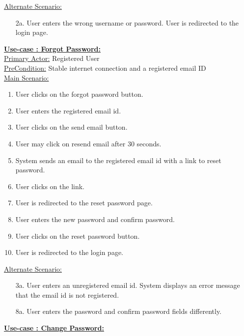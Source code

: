 \documentclass[conference,compsoc]{IEEEtran}
\newcounter{UC}
\newcommand{\nextU}{\stepcounter{UC}\theUC}
\begin{document}
\underline{Alternate Scenario:}\\
\begin{enumerate}
    \item [2a.] User enters the wrong username or password. User is redirected to the login page.
\end{enumerate}\vspace{0.2cm}
\underline{\textbf{Use-case \nextU: Forgot Password:}}\\

\underline{Primary Actor:} Registered User\\

\underline{PreCondition:} Stable internet connection and a registered email ID\\

\underline{Main Scenario:}\\

\begin{enumerate}
    \item User clicks on the forgot password button.
    \item User enters the registered email id.
    \item User clicks on the send email button.
    \item User may click on resend email after 30 seconds.
    \item System sends an email to the registered email id with a link to reset password.
    \item User clicks on the link.
    \item User is redirected to the reset password page.
    \item User enters the new password and confirm password.
    \item User clicks on the reset password button.
    \item User is redirected to the login page.
\end{enumerate}

\underline{Alternate Scenario:}\\
\begin{enumerate}
    \item [3a.] User enters an unregistered email id. System displays an error message that the email id is not registered.
    \item [8a.] User enters the password and confirm password fields differently.
\end{enumerate}\vspace{0.2cm}

\underline{\textbf{Use-case \nextU: Change Password:}}\\
\end{document}
